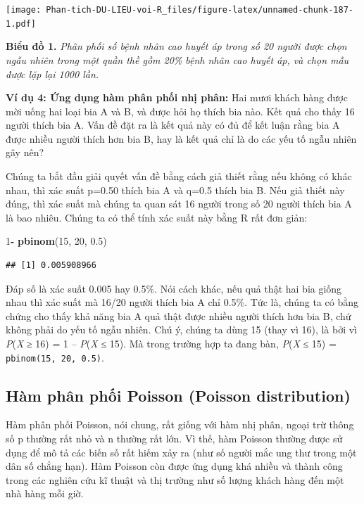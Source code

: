 \documentclass[
]{book}
\newenvironment{Shaded}{\begin{snugshade}}{\end{snugshade}}
\newcommand{\DecValTok}[1]{\textcolor[rgb]{0.00,0.00,0.81}{#1}}
\newcommand{\FloatTok}[1]{\textcolor[rgb]{0.00,0.00,0.81}{#1}}
\newcommand{\KeywordTok}[1]{\textcolor[rgb]{0.13,0.29,0.53}{\textbf{#1}}}
\newcommand{\NormalTok}[1]{#1}
\newcommand{\OperatorTok}[1]{\textcolor[rgb]{0.81,0.36,0.00}{\textbf{#1}}}
\newcommand{\StringTok}[1]{\textcolor[rgb]{0.31,0.60,0.02}{#1}}
\begin{document}
\texttt{[image: Phan-tich-DU-LIEU-voi-R\_files/figure-latex/unnamed-chunk-187-1.pdf]}

\textbf{Biểu đồ 1.} \emph{Phân phối số bệnh nhân cao huyết áp trong số 20 người được chọn ngẫu nhiên trong một quần thề gồm 20\% bệnh nhân cao huyết áp, và chọn mẫu được lặp lại 1000 lần.}

\textbf{Ví dụ 4: Ứng dụng hàm phân phối nhị phân:} Hai mươi khách hàng được mời uống hai loại bia A và B, và được hỏi họ thích bia nào. Kết quả cho thấy 16 người thích bia A. Vấn đề đặt ra là kết quả này có đủ để kết luận rằng bia A được nhiều người thích hơn bia B, hay là kết quả chỉ là do các yếu tố ngẫu nhiên gây nên?

Chúng ta bắt đầu giải quyết vấn đề bằng cách giả thiết rằng nếu không có khác nhau, thì xác suất p=0.50 thích bia A và q=0.5 thích bia B. Nếu giả thiết này đúng, thì xác suất mà chúng ta quan sát 16 người trong số 20 người thích bia A là bao nhiêu. Chúng ta có thể tính xác suất này bằng R rất đơn giản:

\begin{Shaded}
\begin{Highlighting}[]
\DecValTok{1}\OperatorTok{{-}}\StringTok{ }\KeywordTok{pbinom}\NormalTok{(}\DecValTok{15}\NormalTok{, }\DecValTok{20}\NormalTok{, }\FloatTok{0.5}\NormalTok{)}
\end{Highlighting}
\end{Shaded}

\begin{verbatim}
## [1] 0.005908966
\end{verbatim}

Đáp số là xác suất 0.005 hay 0.5\%. Nói cách khác, nếu quả thật hai bia giống nhau thì xác suất mà 16/20 người thích bia A chỉ 0.5\%. Tức là, chúng ta có bằng chứng cho thấy khả năng bia A quả thật được nhiều người thích hơn bia B, chứ không phải do yếu tố ngẫu nhiên. Chú ý, chúng ta dùng 15 (thay vì 16), là bởi vì \emph{P}(\emph{X} ≥ 16) = 1 -- \emph{P}(\emph{X} ≤ 15). Mà trong trường hợp ta đang bàn, \emph{P}(\emph{X} ≤ 15) = \texttt{pbinom(15,\ 20,\ 0.5)}.

\hypertarget{huxe0m-phuxe2n-phux1ed1i-poisson-poisson-distribution}{%
\subsection{Hàm phân phối Poisson (Poisson distribution)}\label{huxe0m-phuxe2n-phux1ed1i-poisson-poisson-distribution}}

Hàm phân phối Poisson, nói chung, rất giống với hàm nhị phân, ngoại trừ thông số p thường rất nhỏ và n thường rất lớn. Vì thế, hàm Poisson thường được sử dụng để mô tả các biến số rất hiếm xảy ra (như số người mắc ung thư trong một dân số chẳng hạn). Hàm Poisson còn được ứng dụng khá nhiều và thành công trong các nghiên cứu kĩ thuật và thị trường như số lượng khách hàng đến một nhà hàng mỗi giờ.
\end{document}
